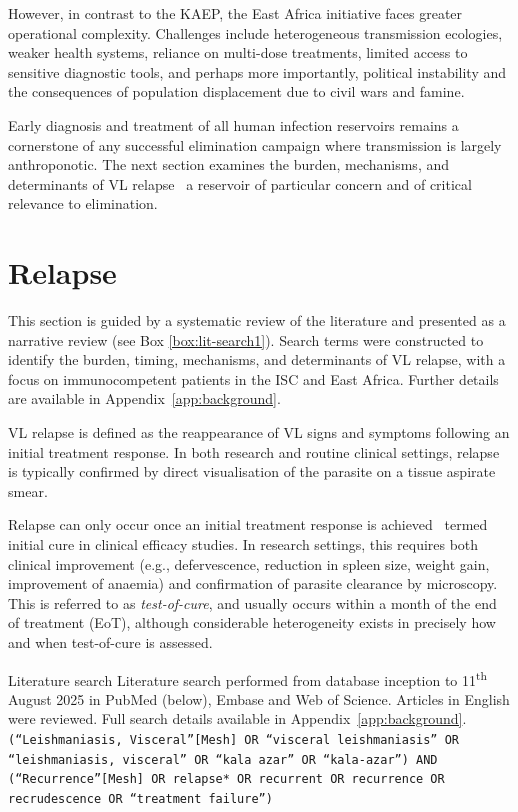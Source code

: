 However, in contrast to the KAEP, the East Africa initiative faces greater operational complexity. Challenges include heterogeneous transmission ecologies, weaker health systems, reliance on multi-dose treatments, limited access to sensitive diagnostic tools, and perhaps more importantly, political instability and the consequences of population displacement due to civil wars and famine\cite{WHO_2024_VL_easternAfrica}.

Early diagnosis and treatment of all human infection reservoirs remains a cornerstone of any successful elimination campaign where transmission is largely anthroponotic. The next section examines the burden, mechanisms, and determinants of VL relapse \textemdash\  a reservoir of particular concern and of critical relevance to elimination.

\section{\label{sec:relapse}Relapse}

This section is guided by a systematic review of the literature and presented as a narrative review (see Box \ref{box:lit-search1}). Search terms were constructed to identify the burden, timing, mechanisms, and determinants of VL relapse, with a focus on immunocompetent patients in the ISC and East Africa. Further details are available in Appendix~\ref{app:background}.

VL relapse is defined as the reappearance of VL signs and symptoms following an initial treatment response\cite{WHO2010kalaazarIndicators, WHO2024_Leishmaniasis}. In both research and routine clinical settings, relapse is typically confirmed by direct visualisation of the parasite on a tissue aspirate smear\cite{chhajed2024}.

Relapse can only occur once an initial treatment response is achieved \textemdash\  termed initial cure in clinical efficacy studies. In research settings, this requires both clinical improvement (e.g., defervescence, reduction in spleen size, weight gain, improvement of anaemia) and confirmation of parasite clearance by microscopy. This is referred to as \textit{test-of-cure}, and usually occurs within a month of the end of treatment (EoT), although considerable heterogeneity exists in precisely how and when test-of-cure is assessed\cite{dahal2024}.

\begin{mybox}[label=box:lit-search1]{Literature search}
  Literature search performed from database inception to 11\textsuperscript{th} August 2025 in PubMed (below), Embase and Web of Science. Articles in English were reviewed. Full search details available in Appendix~\ref{app:background}.
  \tcbline
  \texttt{(``Leishmaniasis, Visceral''[Mesh] OR ``visceral leishmaniasis'' OR ``leishmaniasis, visceral'' OR ``kala azar'' OR ``kala-azar'') AND (``Recurrence''[Mesh] OR relapse* OR recurrent OR recurrence OR recrudescence OR ``treatment failure'')}
\end{mybox}

